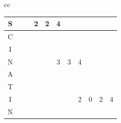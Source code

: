 \begin{table}
\begin{center}
\begin{tabular}[c]{cc}
{\begin{tabular}[c]{c|c|c|c|c|c|c|c|c|c|c|}
				S                    &                       &                       & \cellcolor{green!25}2 & \cellcolor{blue!75}2 & \cellcolor{green!25}4 &                       &                       &                      &                       &                                                                                                                   \\\hline
				C                    &                       &                       & \cellcolor{green!25}  & \cellcolor{green!25} & \cellcolor{green!25}  &                       &                      &                      &                      &                      \\\hline
				I                    &                       &                       & \cellcolor{green!25}  & \cellcolor{green!25} & \cellcolor{blue!25}   & \cellcolor{green!25}  & \cellcolor{green!25} &                      &                      &                      \\\hline
				N                    &                       &                       &                       & & \cellcolor{blue!75}3  & \cellcolor{green!25}3 & \cellcolor{green!25}4 &                      &                       &                                                                                                                   \\\hline
				A                    &                       &                       &                       &                      & \cellcolor{green!25}  & \cellcolor{green!25}  & \cellcolor{green!25} &                      &                      &                      \\\hline
				T                    &                       &                       &                       &                      & \cellcolor{green!25}  & \cellcolor{green!25}  & \cellcolor{blue!25}  & \cellcolor{green!25} & \cellcolor{green!25} & \cellcolor{green!25} \\\hline
				I                    &                       &                       &                       & &                       &                       & \cellcolor{green!25}2 & \cellcolor{blue!75}0 & \cellcolor{green!25}2 & \cellcolor{green!25}4                                                                                             \\\hline
				N                    &                       &                       &                       &                      &                       &                       & \cellcolor{green!25} & \cellcolor{green!25} & \cellcolor{green!25} & \cellcolor{green!25} \\\hline

\end{tabular}}
\end{tabular}
\end{center}
\end{table}
